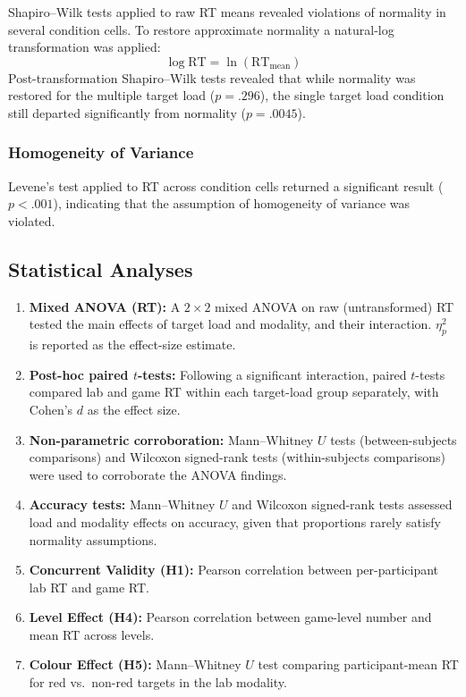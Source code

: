 \documentclass[12pt]{article}
\begin{document}
Shapiro--Wilk tests applied to raw RT means revealed violations of
normality in several condition cells.
To restore approximate normality a natural-log transformation was applied:
\[
  \log\text{RT} = \ln(\text{RT}_{\text{mean}})
\]
Post-transformation Shapiro–Wilk tests revealed that while normality was restored for the multiple target load ($p = .296$), the single target load condition still departed significantly from normality ($p = .0045$).

\subsubsection{Homogeneity of Variance}

Levene’s test applied to RT across condition cells returned a significant result ($p < .001$), indicating that the assumption of homogeneity of variance was violated.

\subsection{Statistical Analyses}

\begin{enumerate}
  \item \textbf{Mixed ANOVA (RT):} A $2 \times 2$ mixed ANOVA on raw (untransformed) RT
    tested the main effects of target load and modality, and their
    interaction. $\eta^2_p$ is reported as the effect-size estimate.
  \item \textbf{Post-hoc paired $t$-tests:} Following a significant
    interaction, paired $t$-tests compared lab and game RT within each
    target-load group separately, with Cohen's $d$ as the effect size.
  \item \textbf{Non-parametric corroboration:}
    Mann--Whitney $U$ tests (between-subjects comparisons) and Wilcoxon
    signed-rank tests (within-subjects comparisons) were used to corroborate
    the ANOVA findings.
  \item \textbf{Accuracy tests:} Mann--Whitney $U$ and Wilcoxon signed-rank
    tests assessed load and modality effects on accuracy, given that
    proportions rarely satisfy normality assumptions.
  \item \textbf{Concurrent Validity (H1):} Pearson correlation between
    per-participant lab RT and game RT.
  \item \textbf{Level Effect (H4):} Pearson correlation between game-level
    number and mean RT across levels.
  \item \textbf{Colour Effect (H5):} Mann--Whitney $U$ test comparing
    participant-mean RT for red vs.\ non-red targets in the lab modality.
\end{enumerate}
\end{document}
